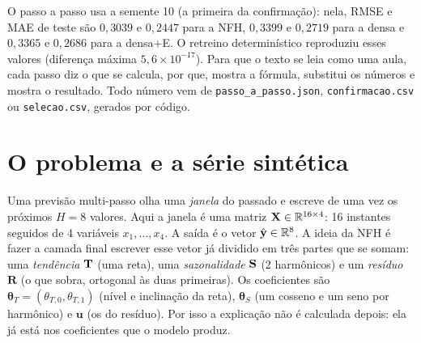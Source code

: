 \documentclass[11pt,a4paper]{article}
\newcommand{\bR}{\mathbf{R}}\newcommand{\byh}{\hat{\mathbf{y}}}\newcommand{\bX}{\mathbf{X}}
\newcommand{\thT}{\boldsymbol{\theta}_T}\newcommand{\thS}{\boldsymbol{\theta}_S}\newcommand{\bu}{\mathbf{u}}
\begin{document}
\begin{table}[H]
\centering
\caption{Confirmação no teste: média $\pm$ desvio-padrão amostral entre as 10 sementes (menor é melhor). As duas últimas colunas contam em quantas sementes a NFH tem erro estritamente menor que o da variante da linha (RMSE e MAE). A última linha é um controle relatado depois da confirmação e não entra no critério (Seção~\ref{sec:resumo}).}\label{tab:prim}
\footnotesize
{}
\par{}
\end{table}

O passo a passo usa a semente 10 (a primeira da confirmação): nela, RMSE e MAE de teste são $0,3039$ e $0,2447$ para a NFH, $0,3399$ e $0,2719$ para a densa e $0,3365$ e $0,2686$ para a densa+E. O retreino determinístico reproduziu esses valores (diferença máxima $5,6\times 10^{-17}$). Para que o texto se leia como uma aula, cada passo diz o que se calcula, por que, mostra a fórmula, substitui os números e mostra o resultado. Todo número vem de \texttt{passo\_a\_passo.json}, \texttt{confirmacao.csv} ou \texttt{selecao.csv}, gerados por código.

\tableofcontents\newpage

\section{O problema e a série sintética}\label{sec:serie}

Uma previsão multi-passo olha uma \emph{janela} do passado e escreve de uma vez os próximos $H=8$ valores. Aqui a janela é uma matriz $\bX\in\R^{16\times 4}$: 16 instantes seguidos de 4 variáveis $x_1,\dots,x_4$. A saída é o vetor $\byh\in\R^{8}$. A ideia da NFH é fazer a camada final escrever esse vetor já dividido em três partes que se somam: uma \emph{tendência} $\mathbf{T}$ (uma reta), uma \emph{sazonalidade} $\mathbf{S}$ (2 harmônicos) e um \emph{resíduo} $\bR$ (o que sobra, ortogonal às duas primeiras). Os coeficientes são $\thT=(\theta_{T,0},\theta_{T,1})$ (nível e inclinação da reta), $\thS$ (um cosseno e um seno por harmônico) e $\bu$ (os do resíduo). Por isso a explicação não é calculada depois: ela já está nos coeficientes que o modelo produz.
\end{document}
